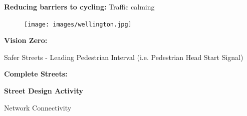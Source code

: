 \documentclass[aspectratio=169]{beamer}
\begin{document}
\begin{frame}
	
	\textbf{Reducing barriers to cycling:} Traffic calming
	
	\begin{figure}
		\centering
		\texttt{[image: images/wellington.jpg]}
	\end{figure}
	
\end{frame}




\begin{frame}
	
	\textbf{Vision Zero:} 
	

	
\end{frame}



\begin{frame}
	
	Safer Streets - Leading Pedestrian Interval (i.e. Pedestrian Head Start Signal)
	
\end{frame}










\begin{frame}
	
	\textbf{Complete Streets:} 
	
	
	
\end{frame}






\begin{frame}
	
	\textbf{Street Design Activity}
	
\end{frame}



\begin{frame}
	
	Network Connectivity
	
\end{frame}
\end{document}
